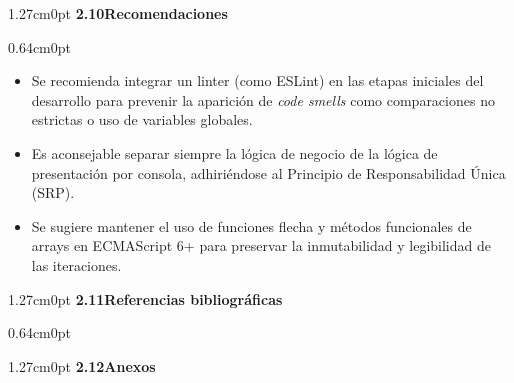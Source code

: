 \documentclass[12pt,letterpaper]{article}
\begin{document}
\vspace{6pt}

\begin{adjustwidth}{1.27cm}{0pt}
\textbf{2.10\enspace Recomendaciones}
\end{adjustwidth}

\vspace{2pt}
\begin{adjustwidth}{0.64cm}{0pt}
\begin{itemize}[leftmargin=1.27cm, label=\textbullet, topsep=1pt, itemsep=0pt, parsep=0pt]
  \item Se recomienda integrar un linter (como ESLint) en las etapas iniciales del desarrollo para prevenir la aparici\'on de \textit{code smells} como comparaciones no estrictas o uso de variables globales.
  \item Es aconsejable separar siempre la l\'ogica de negocio de la l\'ogica de presentaci\'on por consola, adhiri\'endose al Principio de Responsabilidad \'Unica (SRP).
  \item Se sugiere mantener el uso de funciones flecha y m\'etodos funcionales de arrays en ECMAScript 6+ para preservar la inmutabilidad y legibilidad de las iteraciones.
\end{itemize}
\end{adjustwidth}

\vspace{6pt}

\begin{adjustwidth}{1.27cm}{0pt}
\textbf{2.11\enspace Referencias bibliogr\'aficas}
\end{adjustwidth}

\vspace{2pt}
\begin{adjustwidth}{0.64cm}{0pt}
\renewcommand{\refname}{\vspace{-4ex}}


\end{adjustwidth}

\vspace{6pt}

\begin{adjustwidth}{1.27cm}{0pt}
\textbf{2.12\enspace Anexos}
\end{adjustwidth}
\end{document}
